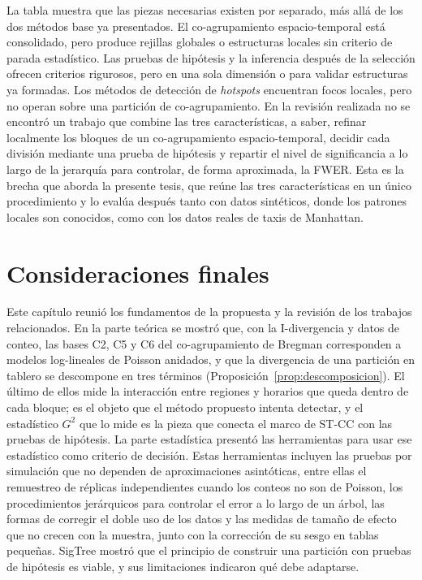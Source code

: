 La tabla muestra que las piezas necesarias existen por separado, más allá
de los dos métodos base ya presentados. El co-agrupamiento espacio-temporal
está consolidado, pero produce rejillas globales o estructuras locales sin
criterio de parada estadístico. Las pruebas de hipótesis y la inferencia
después de la selección ofrecen criterios rigurosos, pero en una sola dimensión o
para validar estructuras ya formadas. Los métodos de detección de
\emph{hotspots} encuentran focos locales, pero no operan sobre una
partición de co-agrupamiento. En la revisión realizada no se encontró un trabajo
que combine las tres características, a saber, refinar localmente los bloques de
un co-agrupamiento espacio-temporal, decidir cada división mediante una prueba de
hipótesis y repartir el nivel de significancia a lo largo de la jerarquía para
controlar, de forma aproximada, la \ac{FWER}. Esta es la brecha que aborda la
presente tesis, que reúne las tres características en un único procedimiento y lo
evalúa después tanto con datos sintéticos, donde los patrones locales son
conocidos, como con los datos reales de taxis de Manhattan.

\section{Consideraciones finales}
\label{sec:marco-finales}

Este capítulo reunió los fundamentos de la propuesta y la revisión de los
trabajos relacionados. En la parte teórica se mostró que, con la I-divergencia y
datos de conteo, las bases C2, C5 y C6 del co-agrupamiento de Bregman
corresponden a modelos log-lineales de Poisson anidados, y que la divergencia de
una partición en tablero se descompone en tres términos
(Proposición~\ref{prop:descomposicion}). El último de ellos mide la interacción
entre regiones y horarios que queda dentro de cada bloque; es el objeto que el
método propuesto intenta detectar, y el estadístico $G^2$ que lo mide es la pieza
que conecta el marco de \ac{ST-CC} con las pruebas de hipótesis. La parte
estadística presentó las herramientas para usar ese estadístico como criterio de
decisión. Estas herramientas incluyen las pruebas por simulación que no dependen
de aproximaciones asintóticas, entre ellas el remuestreo de réplicas
independientes cuando los conteos no son de Poisson, los procedimientos
jerárquicos para controlar el error a lo largo de un árbol, las formas de
corregir el doble uso de los datos y las medidas de tamaño de efecto que no
crecen con la muestra, junto con la corrección de su sesgo en tablas pequeñas.
SigTree mostró que el principio de construir una
partición con pruebas de hipótesis es viable, y sus limitaciones indicaron qué
debe adaptarse.

